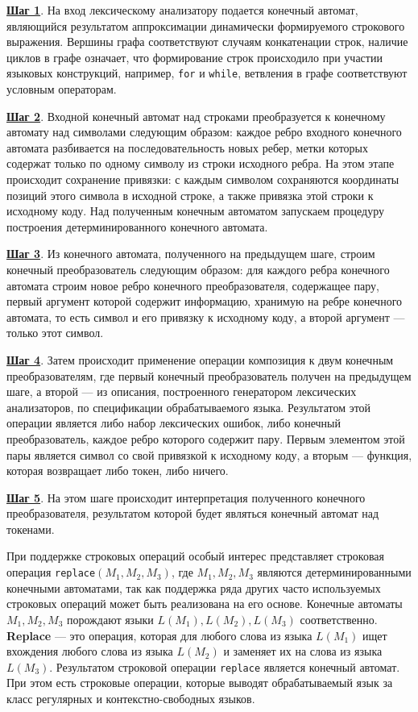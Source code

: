 \textbf{\underline{Шаг 1}}. На вход лексическому анализатору подается конечный автомат, являющийся результатом аппроксимации динамически формируемого строкового выражения. Вершины графа соответствуют случаям конкатенации строк, наличие циклов в графе означает, что формирование строк происходило при участии языковых конструкций, например, \verb|for| и \verb|while|, ветвления в графе соответствуют условным операторам.  

\textbf{\underline{Шаг 2}}. Входной конечный автомат над строками преобразуется к конечному автомату над символами следующим образом: каждое ребро входного конечного автомата разбивается на последовательность новых ребер, метки которых содержат только по одному символу из строки исходного ребра. На этом этапе происходит сохранение привязки: с каждым символом сохраняются координаты позиций этого символа в исходной строке, а также привязка этой строки к исходному коду. Над полученным конечным автоматом запускаем процедуру построения детерминированного конечного автомата. 

\textbf{\underline{Шаг 3}}. Из конечного автомата, полученного на предыдущем шаге, строим конечный преобразователь следующим образом: для каждого ребра конечного автомата строим новое ребро конечного преобразователя, содержащее пару, первый аргумент которой содержит информацию, хранимую на ребре конечного автомата, то есть символ и его привязку к исходному коду, а второй аргумент {---} только этот символ.

\textbf{\underline{Шаг 4}}. Затем происходит применение операции композиция к двум конечным преобразователям, где первый конечный преобразователь получен на предыдущем шаге, а второй {---} из описания, построенного генератором лексических анализаторов, по спецификации обрабатываемого языка. Результатом этой операции является либо набор лексических ошибок, либо конечный преобразователь, каждое ребро которого содержит пару. Первым элементом этой пары является символ со свой привязкой к исходному коду, а вторым {---} функция, которая возвращает либо токен, либо ничего.

\textbf{\underline{Шаг 5}}. На этом шаге происходит интерпретация полученного конечного преобразователя, результатом которой будет являться конечный автомат над токенами.

При поддержке строковых операций особый интерес представляет строковая операция \verb|replace|$(M_1, M_2, M_3)$, где $M_1, M_2, M_3$ являются детерминированными конечными автоматами, так как поддержка ряда других часто используемых строковых операций может быть реализована на его основе. Конечные автоматы $M_1, M_2, M_3$ порождают языки $L(M_1), L(M_2), L(M_3)$ соответственно. \textbf{Replace} --- это операция, которая для любого слова из языка $L(M_1)$ ищет вхождения любого слова из языка $L(M_2)$ и заменяет их на слова из языка $L(M_3)$. Результатом строковой операции \verb|replace| является конечный автомат. При этом есть строковые операции, которые выводят обрабатываемый язык за класс регулярных и контекстно-свободных языков. 

